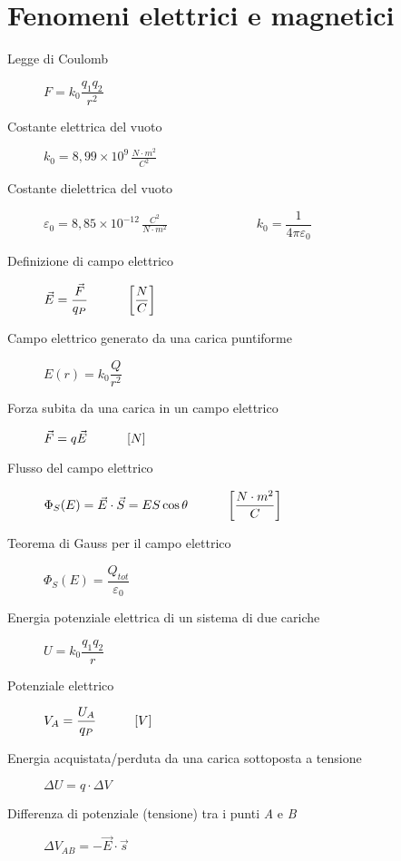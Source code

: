 \documentclass[a4paper,11pt,italian]{article}
\begin{document}
\section{Fenomeni elettrici e magnetici}

\begin{description}
  
  \item[Legge di Coulomb] $ F = k_0 \dfrac{q_1q_2}{r^2} $
  
   \item[Costante elettrica del vuoto ] $ k_0 = 8,99 \times 10^9 \, \frac{N\cdot m^2}{C^2} $
  
  \item[Costante dielettrica del vuoto] $ \varepsilon_0 = 8,85\times 10^{-12} \, \frac{C^2}{N \cdot m^2} $~~~~~~~~~~~~~~$ k_0 = \dfrac{1}{4 \pi \varepsilon_0} $
  
  \item[Definizione di campo elettrico] 
  $ \vec{E}  = \dfrac{\vec{F}}{q_P} \hspace*{3em} \left[ \dfrac{N}{C} \right] $

  \item[Campo elettrico generato da una carica puntiforme] 
  $ E(r) = k_0 \dfrac{Q}{r^2} $
    
  \item[Forza subita da una carica in un campo elettrico] 
  $ \vec{F}  = q\vec{E} \hspace*{3em} \left[ N \right] $

  \item[Flusso del campo elettrico] 
  $ \Phi_S(E) = \vec{E} \cdot \vec{S} = ES \cos \theta \hspace*{3em} \left[ \dfrac{N\cdot m^2}{C} \right] $
  
  \item[Teorema di Gauss per il campo elettrico] 
  $ \Phi_S(E) = \dfrac{Q_{tot}}{\varepsilon_0} $
  
  \item[Energia potenziale elettrica di un sistema di due cariche] 
  $  U = k_0 \dfrac{q_1 q_2}{r}  $
  
  \item[Potenziale elettrico]
  $ V_A = \dfrac{U_A}{q_P} \hspace*{3em} [V] $  

  \item[Energia acquistata/perduta da una carica sottoposta a tensione]
  $ \Delta U = q \cdot \Delta V $   
  
  \item[Differenza di potenziale (tensione) tra i punti \textit{A} e \textit{B}]
  $  \Delta V_{AB} = - \vec{E} \cdot \vec{s} $
  

\end{description}
\end{document}
